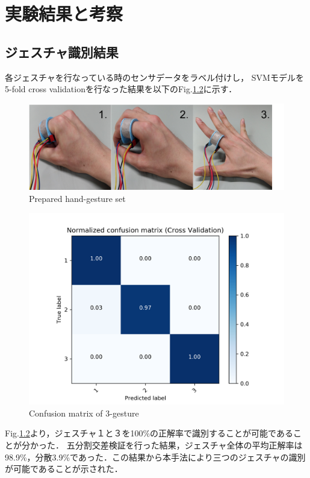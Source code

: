 \chapter{実験結果と考察}

\section{ジェスチャ識別結果}

各ジェスチャを行なっている時のセンサデータをラベル付けし，
SVMモデルを5-fold cross validationを行なった結果を以下のFig.\ref{fig:matrix}に示す．

\begin{figure}[H]
  \centering
  \includegraphics[width=0.8\linewidth]{fig/gesture}
  \caption{Prepared hand-gesture set}
  \label{fig:gesture}
\end{figure}

\begin{figure}[H]
  \centering
  \includegraphics[width=0.8\linewidth]{fig/confusion_matrix}
  \caption{Confusion matrix of 3-gesture}
  \label{fig:matrix}
\end{figure}


Fig.\ref{fig:matrix}より，ジェスチャ１と３を100\%の正解率で識別することが可能であることが分かった．
五分割交差検証を行った結果，ジェスチャ全体の平均正解率は98.9\%，分散3.9\%であった．この結果から本手法により三つのジェスチャの識別が可能であることが示された．

